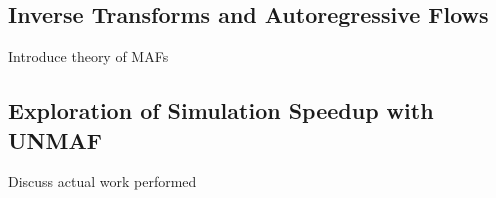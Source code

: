 \subsection{Inverse Transforms and Autoregressive Flows}
    Introduce theory of MAFs

\subsection{Exploration of Simulation Speedup with UNMAF}
    Discuss actual work performed